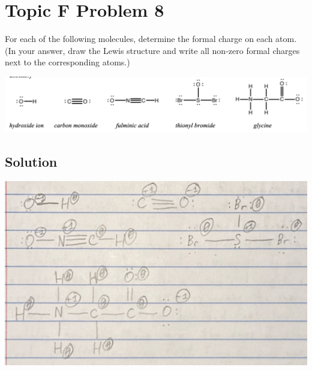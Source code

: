 \documentclass[10pt]{article}
\begin{document}
    \section{Topic F Problem 8}
        For each of the following molecules, determine the formal charge on each atom. 
        (In your answer, draw the Lewis structure and write all non-zero formal charges next to the corresponding atoms.)
        \begin{center}
            \includegraphics[width=\textwidth]{img-F8.png}
        \end{center}
        
        \subsection{Solution}
            \begin{center}
                \includegraphics[width=\textwidth]{Answers Images/F8.jpg}
            \end{center}


    \pagebreak
\end{document}
